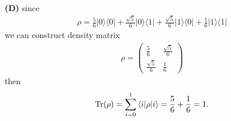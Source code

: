 \documentclass{article}
\newcommand{\op}[2]{|#1\rangle \langle#2|}
\newcommand{\sand}[3]{\braket{#1 | #2 | #3}}
\begin{document}
\textbf{(D)}
since 
\begin{align*}
    \rho = \frac{5}{6}\op{0}{0} + \frac{\sqrt{5}}{6}\op{0}{1} + \frac{\sqrt{5}}{6}\op{1}{0} + \frac{1}{6}\op{1}{1}
\end{align*}
we can construct density matrix
\begin{align*}
    \rho = 
    \begin{pmatrix}
        \displaystyle\frac{5}{6} & \displaystyle\frac{\sqrt{5}}{6} \\[1em]
        \displaystyle\frac{\sqrt{5}}{6} & \displaystyle\frac{1}{6}
    \end{pmatrix}
\end{align*}
then 
\begin{align*}
    \text{Tr}(\rho) = \sum_{i=0}^{1} \sand{i}{\rho}{i} = \frac{5}{6} + \frac{1}{6} = 1.
\end{align*}
\end{document}
